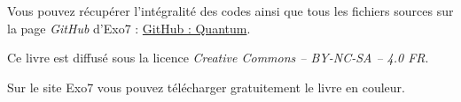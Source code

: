 \bigskip

\begin{center}
Vous pouvez récupérer l'intégralité des codes \Python{} ainsi que tous les fichiers sources sur la page \emph{GitHub} d'Exo7 :
\href{https://github.com/exo7math/quantum-exo7}{\og{}GitHub : Quantum\fg{}}.



\end{center}


\vspace*{\fill}

\bigskip 

\begin{center}
\end{center}



\begin{center}
Ce livre est diffusé sous la licence \emph{Creative Commons -- BY-NC-SA -- 4.0 FR}.

Sur le site Exo7 vous pouvez télécharger gratuitement le livre en couleur.
\end{center}




\printindex
{}

